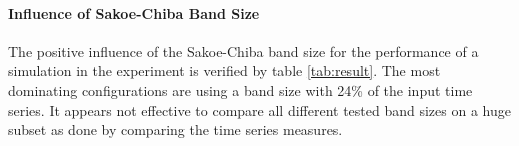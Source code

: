 \paragraph{Influence of Sakoe-Chiba Band Size} \label{influence_of_sakoe-chiba_band_size}
The positive influence of the Sakoe-Chiba band size for the performance of a simulation in the experiment is verified by
table \ref{tab:result}. The most dominating configurations are using a band size with 24\% of the input time series.
It appears not effective to compare all different tested band sizes on a huge subset as done by comparing the time
series measures.
